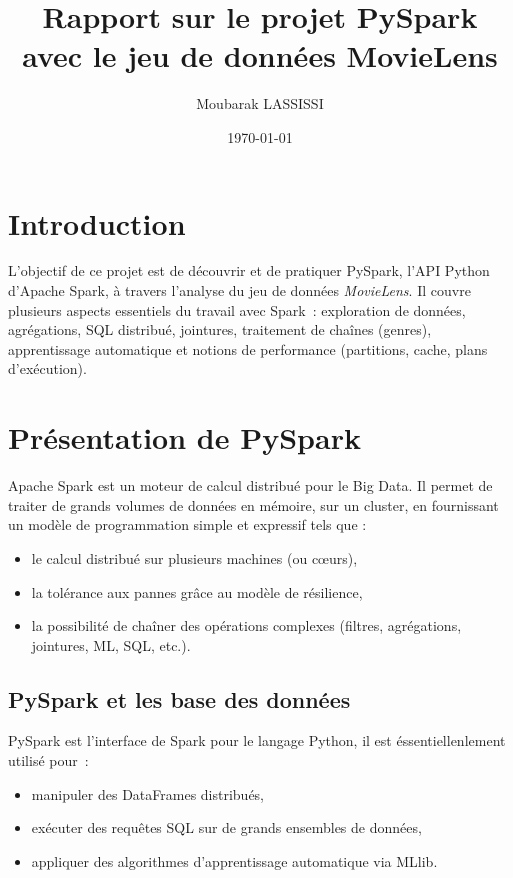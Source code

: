 \documentclass[a4paper,11pt]{article}
\title{Rapport sur le projet PySpark avec le jeu de données MovieLens}
\author{Moubarak LASSISSI}
\date{\today}
\begin{document}
\maketitle

\tableofcontents

\section{Introduction}

L'objectif de ce projet est de découvrir et de pratiquer PySpark,
l'API Python d'Apache Spark, à travers l'analyse du jeu de données
\emph{MovieLens}. Il couvre plusieurs aspects essentiels
du travail avec Spark~: exploration de données, agrégations,
SQL distribué, jointures, traitement de chaînes (genres), apprentissage
automatique  et notions de performance (partitions,
cache, plans d'exécution).

\section{Présentation de PySpark}
Apache Spark est un moteur de calcul distribué pour le Big Data.
Il permet de traiter de grands volumes de données en mémoire, sur
un cluster, en fournissant un modèle de programmation simple et
expressif tels que :
\begin{itemize}
  \item le calcul distribué sur plusieurs machines (ou cœurs),
  \item la tolérance aux pannes grâce au modèle de résilience,
  \item la possibilité de chaîner des opérations complexes
        (filtres, agrégations, jointures, ML, SQL, etc.).
\end{itemize}

\subsection{PySpark et les base des données}
PySpark est l'interface de Spark pour le langage Python, il est éssentiellenlement utilisé pour~:
\begin{itemize}
  \item manipuler des DataFrames distribués,
  \item exécuter des requêtes SQL sur de grands ensembles de données,
  \item appliquer des algorithmes d'apprentissage automatique
        via MLlib.
\end{itemize}
\end{document}
